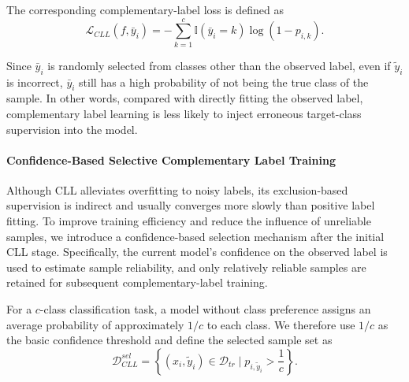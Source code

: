 \documentclass{SCIS2026}
\begin{document}
The corresponding complementary-label loss is defined as
\begin{equation}
	\mathcal{L}_{CLL}(f,\bar{y}_i)
	=
	-\sum_{k=1}^{c}\mathbb{I}(\bar{y}_i=k)\log(1-p_{i,k}).
	\label{eq:CLL_loss}
\end{equation}

Since $\bar{y}_i$ is randomly selected from classes other than the observed label, even if $\tilde{y}_i$ is incorrect, $\bar{y}_i$ still has a high probability of not being the true class of the sample. In other words, compared with directly fitting the observed label, complementary label learning is less likely to inject erroneous target-class supervision into the model.


\paragraph{Confidence-Based Selective Complementary Label Training}
Although CLL alleviates overfitting to noisy labels, its exclusion-based supervision is indirect and usually converges more slowly than positive label fitting. To improve training efficiency and reduce the influence of unreliable samples, we introduce a confidence-based selection mechanism after the initial CLL stage. Specifically, the current model's confidence on the observed label is used to estimate sample reliability, and only relatively reliable samples are retained for subsequent complementary-label training.

For a $c$-class classification task, a model without class preference assigns an average probability of approximately $1/c$ to each class. We therefore use $1/c$ as the basic confidence threshold and define the selected sample set as
\begin{equation} 
	\mathcal{D}_{CLL}^{sel} 
	=
	\left\{ 
	(x_i,\tilde{y}_i)\in \mathcal{D}_{tr} 
	\mid
	p_{i,\tilde{y}_i}>\frac{1}{c} 
	\right\}. 
	\label{eq:selected_cl_set} 
\end{equation} 
\end{document}
